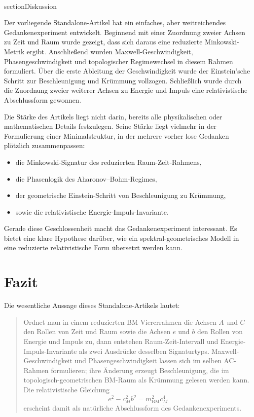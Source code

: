 \documentclass[11pt,a4paper]{article}
\theoremstyle{definition}
\theoremstyle{plain}
\begin{document}
	\\section{Diskussion}
	
	Der vorliegende Standalone-Artikel hat ein einfaches, aber weitreichendes Gedankenexperiment entwickelt. Beginnend mit einer Zuordnung zweier Achsen zu Zeit und Raum wurde gezeigt, dass sich daraus eine reduzierte Minkowski-Metrik ergibt. Anschließend wurden Maxwell-Geschwindigkeit, Phasengeschwindigkeit und topologischer Regimewechsel in diesem Rahmen formuliert. Über die erste Ableitung der Geschwindigkeit wurde der Einstein’sche Schritt zur Beschleunigung und Krümmung vollzogen. Schließlich wurde durch die Zuordnung zweier weiterer Achsen zu Energie und Impuls eine relativistische Abschlussform gewonnen.
	
	Die Stärke des Artikels liegt nicht darin, bereits alle physikalischen oder mathematischen Details festzulegen. Seine Stärke liegt vielmehr in der Formulierung einer Minimalstruktur, in der mehrere vorher lose Gedanken plötzlich zusammenpassen:
	\begin{itemize}[leftmargin=2em]
		\item die Minkowski-Signatur des reduzierten Raum-Zeit-Rahmens,
		\item die Phasenlogik des Aharonov--Bohm-Regimes,
		\item der geometrische Einstein-Schritt von Beschleunigung zu Krümmung,
		\item sowie die relativistische Energie-Impuls-Invariante.
	\end{itemize}
	
	Gerade diese Geschlossenheit macht das Gedankenexperiment interessant. Es bietet eine klare Hypothese darüber, wie ein spektral-geometrisches Modell in eine reduzierte relativistische Form übersetzt werden kann.
	
	\section{Fazit}
	
	Die wesentliche Aussage dieses Standalone-Artikels lautet:
	\begin{quote}
		Ordnet man in einem reduzierten BM-Viererrahmen die Achsen $A$ und $C$ den Rollen von Zeit und Raum sowie die Achsen $e$ und $b$ den Rollen von Energie und Impuls zu, dann entstehen Raum-Zeit-Intervall und Energie-Impuls-Invariante als zwei Ausdrücke desselben Signaturtyps. Maxwell-Geschwindigkeit und Phasengeschwindigkeit lassen sich im selben AC-Rahmen formulieren; ihre Änderung erzeugt Beschleunigung, die im topologisch-geometrischen BM-Raum als Krümmung gelesen werden kann. Die relativistische Gleichung
		\[
		e^2 - c_M^2 b^2 = m_{\mathrm{BM}}^2 c_M^4
		\]
		erscheint damit als natürliche Abschlussform des Gedankenexperiments.
	\end{quote}
\end{document}
